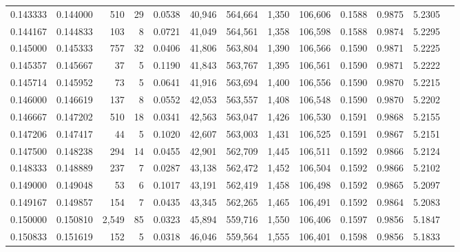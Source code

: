\begin{tabular}{rrrrrrrrrrrrr}
0.143333 & 0.144000 &   510 &  29 &                                     0.0538 &  40,946 & 564,664 &   1,350 & 106,606 & 0.1588 & 0.9875 & 5.2305 \\
0.144167 & 0.144833 &   103 &   8 &                                     0.0721 &  41,049 & 564,561 &   1,358 & 106,598 & 0.1588 & 0.9874 & 5.2295 \\
0.145000 & 0.145333 &   757 &  32 &                                     0.0406 &  41,806 & 563,804 &   1,390 & 106,566 & 0.1590 & 0.9871 & 5.2225 \\
0.145357 & 0.145667 &    37 &   5 &                                     0.1190 &  41,843 & 563,767 &   1,395 & 106,561 & 0.1590 & 0.9871 & 5.2222 \\
0.145714 & 0.145952 &    73 &   5 &                                     0.0641 &  41,916 & 563,694 &   1,400 & 106,556 & 0.1590 & 0.9870 & 5.2215 \\
0.146000 & 0.146619 &   137 &   8 &                                     0.0552 &  42,053 & 563,557 &   1,408 & 106,548 & 0.1590 & 0.9870 & 5.2202 \\
0.146667 & 0.147202 &   510 &  18 &                                     0.0341 &  42,563 & 563,047 &   1,426 & 106,530 & 0.1591 & 0.9868 & 5.2155 \\
0.147206 & 0.147417 &    44 &   5 &                                     0.1020 &  42,607 & 563,003 &   1,431 & 106,525 & 0.1591 & 0.9867 & 5.2151 \\
0.147500 & 0.148238 &   294 &  14 &                                     0.0455 &  42,901 & 562,709 &   1,445 & 106,511 & 0.1592 & 0.9866 & 5.2124 \\
0.148333 & 0.148889 &   237 &   7 &                                     0.0287 &  43,138 & 562,472 &   1,452 & 106,504 & 0.1592 & 0.9866 & 5.2102 \\
0.149000 & 0.149048 &    53 &   6 &                                     0.1017 &  43,191 & 562,419 &   1,458 & 106,498 & 0.1592 & 0.9865 & 5.2097 \\
0.149167 & 0.149857 &   154 &   7 &                                     0.0435 &  43,345 & 562,265 &   1,465 & 106,491 & 0.1592 & 0.9864 & 5.2083 \\
0.150000 & 0.150810 & 2,549 &  85 &                                     0.0323 &  45,894 & 559,716 &   1,550 & 106,406 & 0.1597 & 0.9856 & 5.1847 \\
0.150833 & 0.151619 &   152 &   5 &                                     0.0318 &  46,046 & 559,564 &   1,555 & 106,401 & 0.1598 & 0.9856 & 5.1833 \\

\end{tabular}
